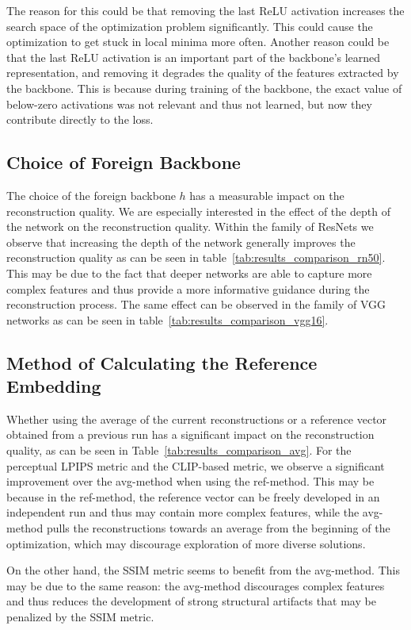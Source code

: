 \documentclass[10pt,twocolumn]{article}
\begin{document}
The reason for this could be that removing the last ReLU activation increases the search space of the optimization problem significantly.
This could cause the optimization to get stuck in local minima more often.
Another reason could be that the last ReLU activation is an important part of the backbone's learned representation, and removing it degrades the quality of the features extracted by the backbone.
This is because during training of the backbone, the exact value of below-zero activations was not relevant and thus not learned, but now they contribute directly to the loss.

\subsection{Choice of Foreign Backbone}
The choice of the foreign backbone $h$ has a measurable impact on the reconstruction quality.
We are especially interested in the effect of the depth of the network on the reconstruction quality.
Within the family of ResNets we observe that increasing the depth of the network generally improves the reconstruction quality as can be seen in table~\ref{tab:results_comparison_rn50}.
This may be due to the fact that deeper networks are able to capture more complex features and thus provide a more informative guidance during the reconstruction process.
The same effect can be observed in the family of VGG networks as can be seen in table~\ref{tab:results_comparison_vgg16}.

\subsection{Method of Calculating the Reference Embedding}
Whether using the average of the current reconstructions or a reference vector obtained from a previous run has a significant impact on the reconstruction quality, as can be seen in Table~\ref{tab:results_comparison_avg}.
For the perceptual LPIPS metric and the CLIP-based metric, we observe a significant improvement over the avg-method when using the ref-method.
This may be because in the ref-method, the reference vector can be freely developed in an independent run and thus may contain more complex features, while the avg-method pulls the reconstructions towards an average from the beginning of the optimization, which may discourage exploration of more diverse solutions.

On the other hand, the SSIM metric seems to benefit from the avg-method.
This may be due to the same reason: the avg-method discourages complex features and thus reduces the development of strong structural artifacts that may be penalized by the SSIM metric.
\end{document}

